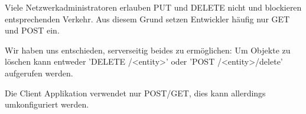 		Viele Netzwerkadministratoren erlauben PUT und DELETE nicht und blockieren entsprechenden Verkehr. Aus diesem Grund setzen Entwickler häufig nur GET und POST ein.
		
		Wir haben uns entschieden, serverseitig beides zu ermöglichen:
		Um Objekte zu löschen kann entweder 'DELETE /<entity>' oder 'POST /<entity>/delete' aufgerufen werden.
		
		Die Client Applikation verwendet nur POST/GET, dies kann allerdings umkonfiguriert werden.